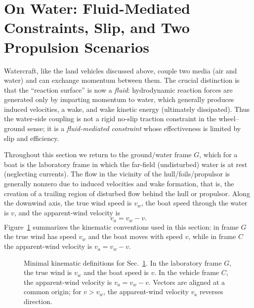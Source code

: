 \documentclass[a4paper]{article}
\begin{document}
\section{On Water: Fluid-Mediated Constraints, Slip, and Two Propulsion Scenarios}
\label{sec:water-sail-prop}

Watercraft, like the land vehicles discussed above, couple two media (air and
water) and can exchange momentum between them.  The crucial distinction is that
the ``reaction surface'' is now a \emph{fluid}: hydrodynamic reaction forces are
generated only by imparting momentum to water, which generally produces induced
velocities, a wake, and wake kinetic energy (ultimately dissipated).  Thus the
water-side coupling is not a rigid no-slip traction constraint in the
wheel--ground sense; it is a \emph{fluid-mediated constraint} whose effectiveness
is limited by slip and efficiency.

Throughout this section we return to the ground/water frame \(G\), which for a
boat is the laboratory frame in which the far-field
(undisturbed) water is at rest (neglecting currents). The flow in the vicinity
of the hull/foils/propulsor is generally nonzero due to induced velocities and
wake formation, that is, the
creation of a trailing region of disturbed flow behind the hull or propulsor.
Along the downwind axis, the true wind speed is \(v_w\), the boat speed
through the water is \(v\), and the apparent-wind velocity is
\[
v_a=v_w-v .
\]
Figure~\ref{fig:water-frame} summarizes the kinematic conventions used in this
section: in frame \(G\) the true wind has speed \(v_w\) and the boat moves with
speed \(v\), while in frame \(C\) the apparent-wind velocity is
\(v_a=v_w-v\).

\begin{figure}[tb]
\centering
{}
\caption{Minimal kinematic definitions for Sec.~\ref{sec:water-sail-prop}. In the laboratory frame \(G\), the true wind is \(v_w\) and the boat speed is \(v\). In the vehicle frame \(C\), the apparent-wind velocity is \(v_a = v_w - v\). Vectors are aligned at a common origin; for \(v > v_w\), the apparent-wind velocity \(v_a\) reverses direction.}
\label{fig:water-frame}
\end{figure}
\end{document}
